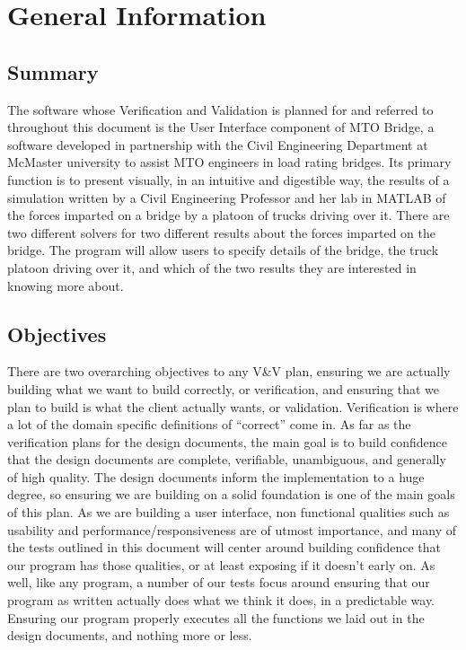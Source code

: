 \documentclass[12pt, titlepage]{article}
\begin{document}
\section{General Information}

\subsection{Summary}

The software whose Verification and Validation is planned for and referred to throughout this document is the User Interface component of MTO Bridge, 
a software developed in partnership with the Civil Engineering Department at McMaster university to assist MTO engineers in load rating bridges.
Its primary function is to present visually, in an intuitive and digestible way, the results of a simulation written by a Civil Engineering Professor and her lab 
in MATLAB of the forces imparted on a bridge by a platoon of trucks driving over it. There are two different solvers for two different results about the forces 
imparted on the bridge. The program will allow users to specify details of the bridge, the truck platoon driving over it, and which of the two results they are 
interested in knowing more about.\\ 

\subsection{Objectives}

There are two overarching objectives to any V\&V plan, ensuring we are actually building what we want to build correctly, or verification,
and ensuring that we plan to build is what the client actually wants, or validation. Verification is where a lot of the domain specific definitions
of “correct” come in. As far as the verification plans for the design documents, the main goal is to build confidence that the design documents are complete,
verifiable, unambiguous, and generally of high quality. The design documents inform the implementation to a huge degree, so ensuring we are building on a solid foundation
is one of the main goals of this plan. As we are building a user interface, non functional qualities such as usability and performance/responsiveness are of 
utmost importance, and many of the tests outlined in this document will center around building confidence that our program has those qualities, or at least 
exposing if it doesn’t early on. As well, like any program, a number of our tests focus around ensuring that our program as written actually does what we think it does,
in a predictable way. Ensuring our program properly executes all the functions we laid out in the design documents, and nothing more or less.\\
\end{document}
